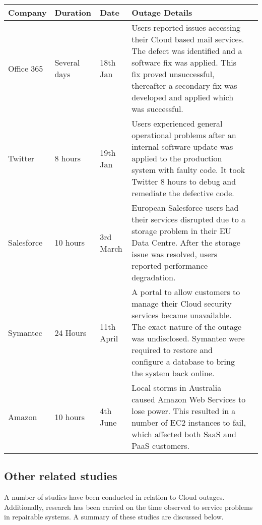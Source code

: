 \documentclass[5p]{elsarticle}
\begin{document}
\begin {table*}[]
\caption {Summary of high profile Cloud outages in the first half of 2016} 
\begin{flushleft}

\begin{tabular}{l | l | l | p{11.4cm} l} \bf {Company} & \bf {Duration} & \bf {Date} & \bf {Outage Details}  
\\ \hline Office 365 & Several days &  18th Jan & Users reported issues accessing their Cloud based mail services. The defect was identified and a software fix was applied. This fix proved unsuccessful, thereafter  a secondary fix was developed and applied which was successful.
\\ \hline Twitter & 8 hours  & 19th Jan & Users experienced general operational problems after an internal software update was applied to the production system with faulty code. It took Twitter 8 hours to debug and remediate the defective code.
\\  \hline Salesforce & 10 hours  &  3rd March &  European Salesforce users had their services disrupted due to a storage problem in their EU Data Centre. After the storage issue was resolved, users reported performance degradation.
\\  \hline Symantec & 24 Hours  &  11th April &  A portal to allow customers to manage their Cloud  security services became unavailable. The exact nature of the outage was undisclosed. Symantec were required to restore and configure a database to bring the system back online.
\\ \hline Amazon & 10 hours  & 4th June & Local storms in Australia caused Amazon Web Services to lose power. This resulted in a number of EC2 instances to fail, which affected both SaaS and PaaS customers. 
\\ \hline 

 \end{tabular}
\end{flushleft}
\end{table*}

\subsection{Other related studies}
A number of studies have been conducted in relation to Cloud outages. Additionally, research has been carried on the time observed to service problems in repairable systems.  A summary of these studies are discussed below. \par
\end{document}
